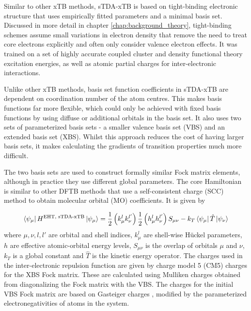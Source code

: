 Similar to other xTB methods, sTDA-xTB is based on tight-binding electronic structure
that uses empirically fitted parameters and a minimal basis set. Discussed in more
detail in chapter \ref{chap:background_theory}, tight-binding schemes assume small
variations in electron density that remove the need to treat core electrons explicitly
and often only consider valence electron effects. It was trained on a set of highly
accurate coupled cluster and density functional theory excitation energies, as well
as atomic partial charges for inter-electronic interactions.

Unlike other xTB methods, basis set function coefficients in sTDA-xTB are dependent
on coordination number of the atom centres. This makes basis functions far more 
flexible, which could only be achieved with fixed basis functions by using diffuse
or additional orbitals in the basis set. It also uses two sets of parameterized 
basis sets - a smaller valence basis set (VBS) and an extended basis set (XBS).
Whilst this approach reduces the cost of having larger basis sets, it makes calculating
the gradients of transition properties much more difficult.

The two basis sets are used to construct formally similar Fock matrix elements,
although in practice they use different global parameters. The core Hamiltonian
is similar to other DFTB methods that use a self-consistent charge (SCC) method 
to obtain molecular orbital (MO) coefficients. It is given by

\begin{equation}
\bra{\psi_\mu} H^{\text{EHT, sTDA-xTB}} \ket{\psi_\mu}= \frac{1}{2} \left(k^l_\mu k^{l'}_\nu\right) \frac{1}{2} \left(h^l_\mu h^{l'}_\nu\right) S_{\mu\nu} - k_T \bra{\psi_\mu}\hat{T}\ket{\psi_\nu}
\end{equation}
%
where $\mu,\nu,l,l'$ are orbital and shell indices, $k^l_\mu$ are shell-wise 
H{\"u}ckel parameters, $h$ are effective atomic-orbital energy levels, $S_{\mu\nu}$
is the overlap of orbitals $\mu$ and $\nu$, $k_T$ is a global constant and $\hat{T}$
is the kinetic energy operator. The charges used in the inter-electronic repulsion 
function are given by charge model 5 (CM5) \cite{Marenich2012} charges for the XBS
Fock matrix. These are calculated using Mulliken charges obtained from diagonalizing
the Fock matrix with the VBS. The charges for the initial VBS Fock matrix are based
on Gasteiger charges \cite{Gasteiger1978}, modified by the parameterized
electronegativities of atoms in the system.

